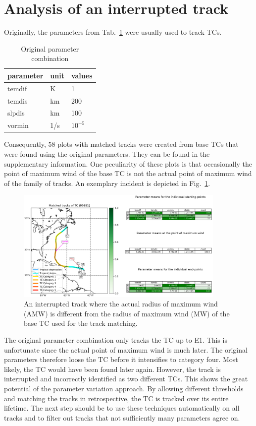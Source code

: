 \section{Analysis of an interrupted track}
Originally, the parameters from Tab.~\ref{tab:orig-params} were usually used to track TCs.
\begin{table}[!htb]
	\centering
	\begin{tabular}{|l|l|l|}
		\hline
		\textbf{parameter} & \textbf{unit} & \textbf{values} \\ \hline
		temdif             & K             & 1     \\
		temdis             & km             & 200          \\
		slpdis             & km             & 100          \\
		vormin             & 1/s           & $10^{-5}$
		\\
		\hline
	\end{tabular}
	\caption{Original parameter combination}
	\label{tab:orig-params}
\end{table}
Consequently, 58 plots with matched tracks were created from base TCs that were found using the original parameters. They can be found in the supplementary information. One peculiarity of these plots is that occasionally the point of maximum wind of the base TC is not the actual point of maximum wind of the family of tracks. An exemplary incident is depicted in Fig.~\ref{fig:interrupted-track}. 
\begin{figure}[!htb]
	\centering
	\includegraphics[width=0.9\textwidth]{img/matching_plot_reasonable_amw_ref_04_tc90881_param_id149_cat0.png}
	\caption{An interrupted track where the actual radius of maximum wind (AMW) is different from the radius of maximum wind (MW) of the base TC used for the track matching.}
	\label{fig:interrupted-track}
\end{figure}
The original parameter combination only tracks the TC up to E1. This is unfortunate since the actual point of maximum wind is much later. The original parameters therefore loose the TC before it intensifies to category four. Most likely, the TC would have been found later again. However, the track is interrupted and incorrectly identified as two different TCs. This shows the great potential of the parameter variation approach. By allowing different thresholds and matching the tracks in retrospective, the TC is tracked over its entire lifetime. The next step should be to use these techniques automatically on all tracks and to filter out tracks that not sufficiently many parameters agree on. 
